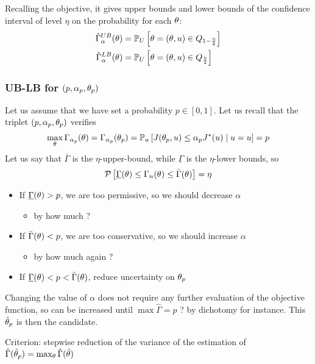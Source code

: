 \documentclass[../../Main_ManuscritThese.tex]{subfiles}
\begin{document}
Recalling the objective, it gives upper bounds and lower bounds of the confidence interval of level $\eta$ on the probability for each $\theta$:
\begin{align}
  \hat{\Gamma}_{\alpha}^{UB}(\theta) &= \mathbb{P}_U\left[\theta=(\theta,u) \in Q_{1-\frac{\eta}{2}}\right] \\
  \hat{\Gamma}_{\alpha}^{LB}(\theta) &= \mathbb{P}_U\left[\theta=(\theta,u) \in Q_{\frac{\eta}{2}}\right]
\end{align}



\subsubsection{UB-LB for $(p, \alpha_p, \theta_p)$}
Let us assume that we have set a probability $p\in [0,1]$. Let us recall that the triplet $(p, \alpha_p, \theta_p)$ verifies
\begin{align}
  \max_{\theta} \Gamma_{\alpha_p}(\theta) = \Gamma_{\alpha_p}(\theta_p) = \mathbb{P}_{u}\left[J(\theta_p,u) \leq \alpha_p J^*(u)\mid u = u\right] = p
\end{align}
Let us say that $\bar{\Gamma}$ is the $\eta$-upper-bound, while $\underline{\Gamma}$ is the $\eta$-lower bounds, so
\begin{equation}
  \mathcal{P}\left[\underline{\Gamma}(\theta) \leq \Gamma_n(\theta) \leq \bar{\Gamma}(\theta)\right] = \eta
\end{equation}
\begin{itemize}
\item If $\underline{\Gamma}(\theta)>p$, we are too permissive, so we should decrease $\alpha$
  \begin{itemize}
  \item by how much ?
  \end{itemize}
\item If $\bar{\Gamma}(\theta)<p$, we are too conservative, so we should increase $\alpha$
  \begin{itemize}
  \item by how much again ?
  \end{itemize}
 \item If $\underline{\Gamma}(\theta)<p<\bar{\Gamma}(\theta)$, reduce uncertainty on $\theta_p$
\end{itemize}
Changing the value of $\alpha$ does not require any further evaluation of the objective function, so can be increased until $\max \hat{\Gamma} = p$ ? by dichotomy for instance. This $\hat{\theta}_p$ is then the candidate.

Criterion: stepwise reduction of the variance of the estimation of $\hat{\Gamma}(\hat{\theta}_p) = \max_{\theta}\hat{\Gamma}(\hat{\theta})$
\end{document}
